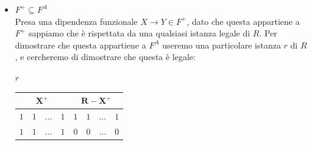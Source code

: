 \documentclass[11pt, a4paper, titlepage, oneside]{scrbook}
\begin{document}
\begin{itemize}
\begin{itemize}
\begin{enumerate}[label=\arabic*°]
            \item Caso: $X \longrightarrow Y$ è ottenuta mediante l'assioma della transitività. \\
            In questo caso abbiamo altre due dipendenze funzionali $X \longrightarrow Z$ e $Z \longrightarrow Y$ in $F^A$, ottenute applicando gli assiomi di Armstrong al più $i-1$ volte. Dunque, per ipotesi induttiva forte, troviamo che $X \longrightarrow Z, Y \longrightarrow Z \in F^+$. Presa ora un'istanza legale $r$ e due tuple $t_1$ e $t_2$ in $r$ tali che $t_1[X] = t_2[X]$, sappiamo per la dipendenza $X \longrightarrow Z$ che $t_1[Z] = t_2[Z]$, e per la dipendenza $Z \longrightarrow Y $ sappiamo che $t_1[Y] = t_2[Y]$. Dunque troviamo che $X \longrightarrow Y \in F^+$.
        \end{enumerate}
        Dato che in tutti e tre i casi trovimao che $X \longrightarrow Y \in F^+$, possiamo concludere che $F^A \subseteq F^+$. $\blacksquare$
    \end{itemize}
    \item $F^+ \subseteq F^A$ \\
    Presa una dipendenza funzionale $X \longrightarrow Y \in F^+$, dato che questa appartiene a $F^+$ sappiamo che è rispettata da una qualsiasi istanza legale di $R$. Per dimostrare che questa appartiene a $F^A$ useremo una particolare istanza $r$ di $R$, e cercheremo di dimostrare che questa è legale:
    \begin{center}
    $r$ \nopagebreak

    \begin{tabular}{|c|c|c|c|c|c|c|c|}
    \hline
    \multicolumn{4}{|c|}{$\bm{X^+}$} & \multicolumn{4}{c|}{$\bm{R - X^+}$}\\ \hline
    $1$ & $1$ & $\dots$ & $1$ & $1$ & $1$ & $\dots$ & $1$\\
    $1$ & $1$ & $\dots$ & $1$ & $0$ & $0$ & $\dots$ & $0$\\ \hline
    \end{tabular}
    \end{center}


\end{itemize}
\end{document}

